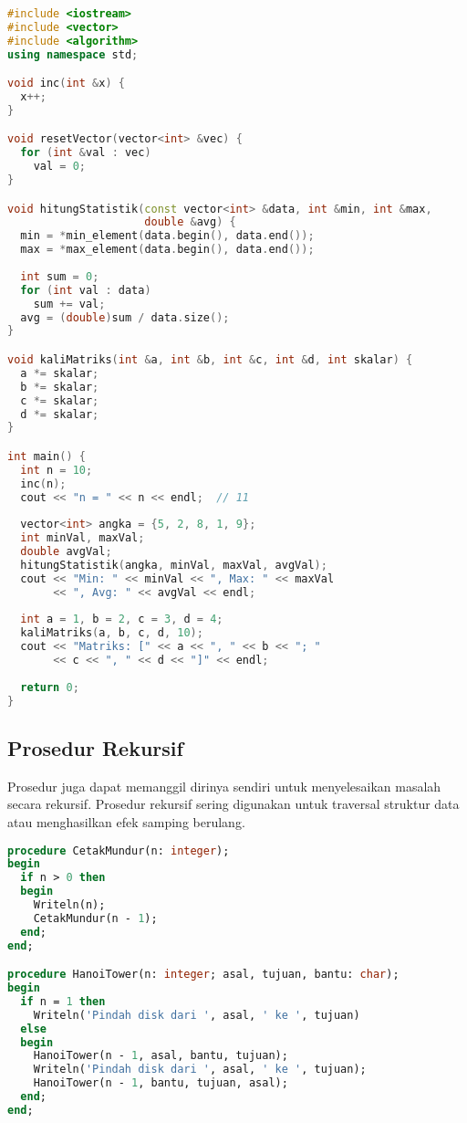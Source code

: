 \documentclass[../main.tex]{subfiles}
\begin{document}
\begin{lstlisting}[language=C++, caption={Pass by reference (C++)}]
#include <iostream>
#include <vector>
#include <algorithm>
using namespace std;

void inc(int &x) {
  x++;
}

void resetVector(vector<int> &vec) {
  for (int &val : vec)
    val = 0;
}

void hitungStatistik(const vector<int> &data, int &min, int &max, 
                     double &avg) {
  min = *min_element(data.begin(), data.end());
  max = *max_element(data.begin(), data.end());
  
  int sum = 0;
  for (int val : data)
    sum += val;
  avg = (double)sum / data.size();
}

void kaliMatriks(int &a, int &b, int &c, int &d, int skalar) {
  a *= skalar;
  b *= skalar;
  c *= skalar;
  d *= skalar;
}

int main() {
  int n = 10;
  inc(n);
  cout << "n = " << n << endl;  // 11
  
  vector<int> angka = {5, 2, 8, 1, 9};
  int minVal, maxVal;
  double avgVal;
  hitungStatistik(angka, minVal, maxVal, avgVal);
  cout << "Min: " << minVal << ", Max: " << maxVal 
       << ", Avg: " << avgVal << endl;
  
  int a = 1, b = 2, c = 3, d = 4;
  kaliMatriks(a, b, c, d, 10);
  cout << "Matriks: [" << a << ", " << b << "; " 
       << c << ", " << d << "]" << endl;
  
  return 0;
}
\end{lstlisting}

\subsection{Prosedur Rekursif}
Prosedur juga dapat memanggil dirinya sendiri untuk menyelesaikan masalah secara rekursif. Prosedur rekursif sering digunakan untuk traversal struktur data atau menghasilkan efek samping berulang.

\begin{lstlisting}[language=Pascal, caption={Prosedur rekursif (Pascal)}]
procedure CetakMundur(n: integer);
begin
  if n > 0 then
  begin
    Writeln(n);
    CetakMundur(n - 1);
  end;
end;

procedure HanoiTower(n: integer; asal, tujuan, bantu: char);
begin
  if n = 1 then
    Writeln('Pindah disk dari ', asal, ' ke ', tujuan)
  else
  begin
    HanoiTower(n - 1, asal, bantu, tujuan);
    Writeln('Pindah disk dari ', asal, ' ke ', tujuan);
    HanoiTower(n - 1, bantu, tujuan, asal);
  end;
end;
\end{lstlisting}
\end{document}
